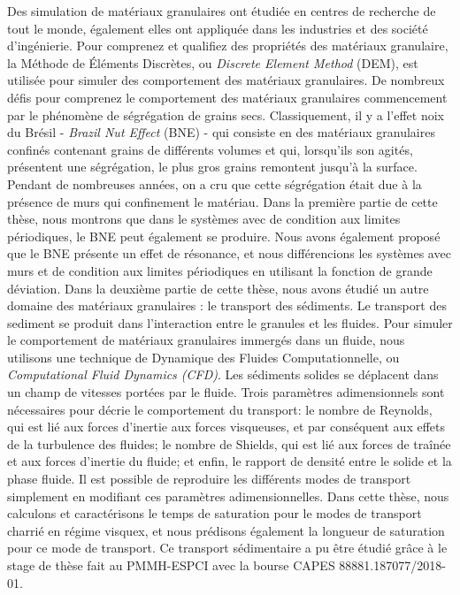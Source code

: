 
\begin{resumo}[Résumé]
    Des simulation de matériaux granulaires ont étudiée en centres de recherche de tout le monde, également elles ont appliquée dans les industries et des société d'ingénierie. Pour comprenez et qualifiez des propriétés des matériaux granulaire, la Méthode de Éléments Discrètes, ou \textit{Discrete Element Method} (DEM), est utilisée pour simuler des comportement des matériaux granulaires.
    De nombreux défis pour comprenez le comportement des matériaux granulaires commencement par le phénomène de ségrégation de grains secs. Classiquement, il y a l'effet noix du Brésil - \textit{Brazil Nut Effect} (BNE) - qui consiste en des matériaux granulaires confinés contenant grains de différents volumes et qui, lorsqu'ils son agités, présentent une ségrégation, le plus gros grains remontent jusqu'à la surface. Pendant de nombreuses années, on a cru que cette ségrégation était due à la présence de murs qui confinement le matériau. Dans la première partie de cette thèse, nous montrons que dans le systèmes avec de condition aux limites périodiques, le BNE peut également se produire. Nous avons également proposé que le BNE présente un effet de résonance, et nous différencions les systèmes avec murs et de condition aux limites périodiques en utilisant la fonction de grande déviation.
    Dans la deuxième partie de cette thèse, nous avons étudié un autre domaine des matériaux granulaires : le transport des sédiments. Le transport des sediment se produit dans l'interaction entre le granules et les fluides. Pour simuler le comportement de matériaux granulaires immergés dans un fluide, nous utilisons une technique de Dynamique des Fluides Computationnelle, ou \textit{Computational Fluid Dynamics (CFD)}. Les sédiments solides se déplacent dans un champ de vitesses portées par le fluide. Trois paramètres adimensionnels sont nécessaires pour décrie le comportement du transport: le nombre de Reynolds, qui est lié aux forces d'inertie aux forces visqueuses, et par conséquent aux effets de la turbulence des fluides; le nombre de Shields, qui est lié aux forces de traînée et aux forces d'inertie du fluide; et enfin, le rapport de densité entre le solide et la phase fluide. Il est possible de reproduire les différents modes de transport simplement en modifiant ces paramètres adimensionnelles. Dans cette thèse, nous calculons et caractérisons le temps de saturation pour le modes de transport charrié en régime visquex, et nous prédisons également la longueur de saturation pour ce mode de transport. Ce transport sédimentaire a pu être étudié grâce à le stage de thèse fait au PMMH-ESPCI avec la bourse CAPES 88881.187077/2018-01.


\end{resumo}
